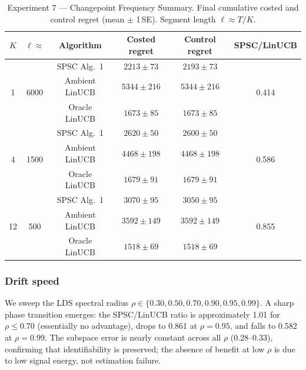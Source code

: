 \documentclass{article}
\begin{document}
{\begin{table}[!htpb]
  \centering
  \caption{Experiment 7 --- Changepoint Frequency Summary.
    Final cumulative costed and control regret (mean $\pm$ 1\,SE).
    Segment length $\ell \approx T/K$.}
  \label{tab:exp7}
  \small
  \setlength{\tabcolsep}{4pt}
  \begin{tabular}{cccccc}
    \toprule
    $K$ & $\ell \approx$ & Algorithm & Costed regret & Control regret & SPSC/LinUCB \\
    \midrule
    \multirow{3}{*}{1} & \multirow{3}{*}{6000}
      & SPSC Alg.\ 1   & $2213 \pm 73$  & $2193 \pm 73$  & \multirow{3}{*}{0.414} \\
      & & Ambient LinUCB & $5344 \pm 216$ & $5344 \pm 216$ & \\
      & & Oracle LinUCB  & $1673 \pm 85$  & $1673 \pm 85$  & \\
    \midrule
    \multirow{3}{*}{4} & \multirow{3}{*}{1500}
      & SPSC Alg.\ 1   & $2620 \pm 50$  & $2600 \pm 50$  & \multirow{3}{*}{0.586} \\
      & & Ambient LinUCB & $4468 \pm 198$ & $4468 \pm 198$ & \\
      & & Oracle LinUCB  & $1679 \pm 91$  & $1679 \pm 91$  & \\
    \midrule
    \multirow{3}{*}{12} & \multirow{3}{*}{500}
      & SPSC Alg.\ 1   & $3070 \pm 95$  & $3050 \pm 95$  & \multirow{3}{*}{0.855} \\
      & & Ambient LinUCB & $3592 \pm 149$ & $3592 \pm 149$ & \\
      & & Oracle LinUCB  & $1518 \pm 69$  & $1518 \pm 69$  & \\
    \bottomrule
  \end{tabular}
\end{table}

\subsubsection{Drift speed}

We sweep the LDS spectral radius $\rho \in \{0.30, 0.50, 0.70, 0.90, 0.95, 0.99\}$.
A sharp phase transition emerges: the SPSC/LinUCB ratio is approximately 1.01 for $\rho \le 0.70$ (essentially no advantage), drops to 0.861 at $\rho{=}0.95$, and falls to 0.582 at $\rho{=}0.99$.
The subspace error is nearly constant across all $\rho$ (0.28--0.33), confirming that identifiability is preserved; the absence of benefit at low $\rho$ is due to low signal energy, not estimation failure.

}
\end{document}
